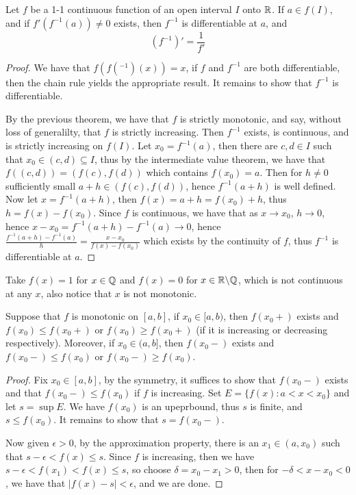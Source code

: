 \begin{theorem}\label{4.4.3}
    Let $f$ be a 1-1 continuous function of an open interval  $I$ onto  $\mathbb{R}$. If  $a \in f(I)$, 
    and if  $f'(f^{-1}(a)) \neq 0$ exists, then  $f^{-1}$ is differentiable at $a$, and 
        \begin{equation}
            (f^{-1})'=\frac{1}{f'}
        \end{equation} 
\end{theorem}
\begin{proof}
    We have that $f(f(^{-1})(x))=x$, if $f$ and $f^{-1}$ are both differentiable, then 
    the chain rule yields the appropriate result. It remains to show that  $f^{-1}$ is 
    differentiable.

    By the previous theorem, we have that  $f$ is strictly monotonic, and say, without 
    loss of generalilty, that  $f$ is strictly increasing. Then  $f^{-1}$ exists, is continuous, and 
    is strictly increasing on $f(I)$. Let  $x_0=f^{-1}(a)$, then there are $c,d \in I$ such that 
    $x_0 \in (c,d) \subseteq I$, thus by the intermediate value theorem, we have that  $f((c,d))=(f(c),f(d))$ which 
    contains  $f(x_0)=a$. Then for $h \neq 0$ sufficiently small  $a+h \in (f(c),f(d))$, 
    hence $f^{-1}(a+h)$ is well defined. Now let  $x=f^{-1}(a+h)$, then  $f(x)=a+h=f(x_0)+h$, 
    thus $h=f(x)-f(x_0)$. Since $f$ is continuous, we have that as  $x \rightarrow x_0$, $h \rightarrow 0$, 
    hence  $x-x_0=f^{-1}(a+h)-f^{-1}(a) \rightarrow 0$, hence $\frac{f^{-1}(a+h)-f^{-1}(a)}{h}=
    \frac{x-x_0}{f(x)-f(x_0)}$ which exists by the continuity of $f$, thus  $f^{-1}$ is differentiable at  $a$.
\end{proof}

\begin{example}
    Take $f(x)=1$ for  $x \in \mathbb{Q}$ and  $f(x)=0$ for  $x \in \mathbb{R}\backslash\mathbb{Q}$, which is not 
    continuous at any $x$, also notice that  $x$ is not monotonic.
\end{example}

\begin{lemma}\label{4.4.4}
    Suppose that $f$ is monotonic on  $[a,b]$, if  $x_0 \in [a,b)$, then $f(x_0+)$ exists and 
    $f(x_0) \leq f(x_0+)$ or $f(x_0) \geq f(x_0+)$ (if it is increasing or decreasing respectively). Moreover, 
    if $x_0 \in (a,b]$, then $f(x_0-)$ exists and $f(x_0-) \leq f(x_0)$ or $f(x_0-) \geq f(x_0)$.
\end{lemma}
\begin{proof}
    Fix $x_0 \in [a,b]$, by the symmetry, it suffices to show that $f(x_0-)$ exists and that 
    $f(x_0-) \leq f(x_0)$ if $f$ is increasing. Set  $E=\{f(x):a<x<x_0\}$ and let $s=\sup{E}$. We have 
    $f (x_0)$ is an upeprbound, thus $s$ is finite, and  $s \leq f(x_0)$. It remains to show that $s=f(x_0-)$.

    Now given $\epsilon>0$, by the approximation property, there is an $x_1 \in (a,x_0)$ such that 
    $s-\epsilon<f(x) \leq s$. Since  $f$ is increasing, then we have  $s-\epsilon<f(x_1)<f(x) \leq s$, so 
    choose $\delta=x_0-x_1>0$, then for $-\delta<x-x_0<0$, we have that $|f(x)-s|<\epsilon$, and we are 
    done.
\end{proof}

